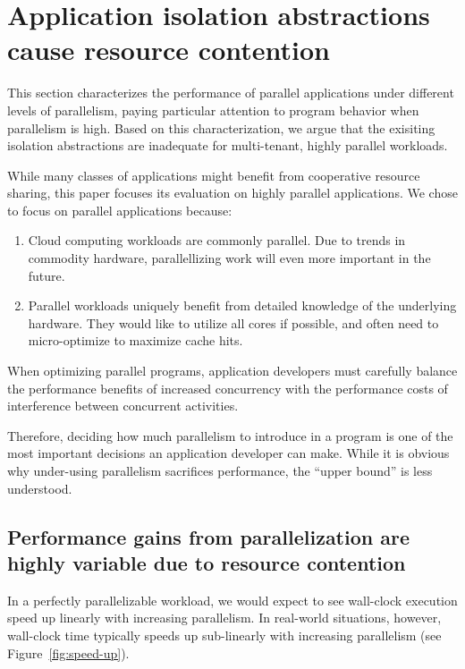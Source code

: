 \section{Application isolation abstractions cause resource contention}
This section characterizes the performance of parallel applications under different levels of parallelism, paying particular attention to program behavior when parallelism is high. Based on this characterization, we argue that the exisiting isolation abstractions are inadequate for multi-tenant, highly parallel workloads.

While many classes of applications might benefit from cooperative resource sharing, this paper focuses its evaluation on highly parallel applications. We chose to focus on parallel applications because:
\begin{enumerate}
    \item Cloud computing workloads are commonly parallel. Due to trends in commodity hardware, parallellizing work will even more important in the future.
    \item Parallel workloads uniquely benefit from detailed knowledge of the underlying hardware. They would like to utilize all cores if possible, and often need to micro-optimize to maximize cache hits.
\end{enumerate}

When optimizing parallel programs, application developers must carefully balance the performance benefits of increased concurrency with the performance costs of interference between concurrent activities.

Therefore, deciding how much parallelism to introduce in a program is one of the most important decisions an application developer can make. While it is obvious why under-using parallelism sacrifices performance, the ``upper bound'' is less understood.



\subsection{Performance gains from parallelization are highly variable due to resource contention}
In a perfectly parallelizable workload, we would expect to see wall-clock execution speed up linearly with increasing parallelism. In real-world situations, however, wall-clock time typically speeds up sub-linearly with increasing parallelism (see Figure~\ref{fig:speed-up}).



